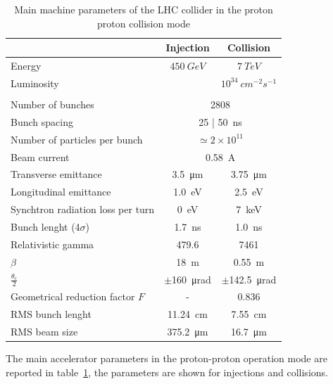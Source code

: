 \begin{table}
\center

\begin{tabular}{lcc}
\hline
								& Injection & Collision\\%
\hline
Energy 							& $450~GeV$  	& $7~TeV$ \\
Luminosity 						& & $10^{34}~cm^{-2}s^{-1}$  \\ %
								& &  \\
Number of bunches 					& \multicolumn{2}{c}{2808}\\ 		%
Bunch spacing 						& \multicolumn{2}{c}{25 | \SI{50} {\nano\second}}\\%
Number of particles per bunch 			& \multicolumn{2}{c}{$\simeq2\times 10^{11}$}       \\
Beam current 						& \multicolumn{2}{c}{\SI{0.58}{\ampere}} \\
Transverse emittance 				&\SI{3.5}{\micro\meter}	&\SI{3.75}{\micro\meter} \\
Longitudinal emittance 				& \SI{1.0}{\eV} 	& \SI{2.5}{\eV} \\
Synchtron radiation loss per turn		& \SI{0}{\eV} 	& \SI{7}{\keV} 	\\
Bunch lenght (4$\sigma$)				&\SI{1.7}{\nano\second} &\SI{1.0}{\nano\second} \\
Relativistic gamma 					& 479.6 & 7461 \\
$\beta$							& \SI{18}{\meter} & \SI{0.55}{\meter}\\
$\frac{\theta_c}{2}$ 					& $\pm$\SI{160}{\micro\radian}& $\pm$\SI{142.5}{\micro\radian} \\
Geometrical reduction factor $F$ 		& - & 0.836 \\
RMS bunch lenght 					& \SI{11.24}{\centi\meter}& \SI{7.55}{\centi\meter}\\
RMS beam size 					& \SI{375.2}{\micro\meter}& \SI{16.7}{\micro\meter} \\
\hline
\end{tabular}

\caption{Main machine parameters of the LHC collider in the proton proton collision mode}
\label{table:LHC_par}
\end{table}

The main accelerator parameters in the proton-proton operation mode are reported in table~\ref{table:LHC_par}, the parameters are shown for injections and collisions.



